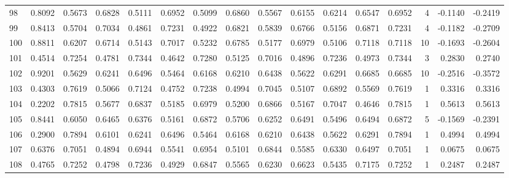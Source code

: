 \begin{tabular}{lrrrrrrrrrrrrrrr}
98  &      0.8092 &  0.5673 &  0.6828 &  0.5111 &  0.6952 &  0.5099 &  0.6860 &  0.5567 &  0.6155 &  0.6214 &   0.6547 &     0.6952 &      4 &                   -0.1140 &                    -0.2419 \\
99  &      0.8413 &  0.5704 &  0.7034 &  0.4861 &  0.7231 &  0.4922 &  0.6821 &  0.5839 &  0.6766 &  0.5156 &   0.6871 &     0.7231 &      4 &                   -0.1182 &                    -0.2709 \\
100 &      0.8811 &  0.6207 &  0.6714 &  0.5143 &  0.7017 &  0.5232 &  0.6785 &  0.5177 &  0.6979 &  0.5106 &   0.7118 &     0.7118 &     10 &                   -0.1693 &                    -0.2604 \\
101 &      0.4514 &  0.7254 &  0.4781 &  0.7344 &  0.4642 &  0.7280 &  0.5125 &  0.7016 &  0.4896 &  0.7236 &   0.4973 &     0.7344 &      3 &                    0.2830 &                     0.2740 \\
102 &      0.9201 &  0.5629 &  0.6241 &  0.6496 &  0.5464 &  0.6168 &  0.6210 &  0.6438 &  0.5622 &  0.6291 &   0.6685 &     0.6685 &     10 &                   -0.2516 &                    -0.3572 \\
103 &      0.4303 &  0.7619 &  0.5066 &  0.7124 &  0.4752 &  0.7238 &  0.4994 &  0.7045 &  0.5107 &  0.6892 &   0.5569 &     0.7619 &      1 &                    0.3316 &                     0.3316 \\
104 &      0.2202 &  0.7815 &  0.5677 &  0.6837 &  0.5185 &  0.6979 &  0.5200 &  0.6866 &  0.5167 &  0.7047 &   0.4646 &     0.7815 &      1 &                    0.5613 &                     0.5613 \\
105 &      0.8441 &  0.6050 &  0.6465 &  0.6376 &  0.5161 &  0.6872 &  0.5706 &  0.6252 &  0.6491 &  0.5496 &   0.6494 &     0.6872 &      5 &                   -0.1569 &                    -0.2391 \\
106 &      0.2900 &  0.7894 &  0.6101 &  0.6241 &  0.6496 &  0.5464 &  0.6168 &  0.6210 &  0.6438 &  0.5622 &   0.6291 &     0.7894 &      1 &                    0.4994 &                     0.4994 \\
107 &      0.6376 &  0.7051 &  0.4894 &  0.6944 &  0.5541 &  0.6954 &  0.5101 &  0.6844 &  0.5585 &  0.6330 &   0.6497 &     0.7051 &      1 &                    0.0675 &                     0.0675 \\
108 &      0.4765 &  0.7252 &  0.4798 &  0.7236 &  0.4929 &  0.6847 &  0.5565 &  0.6230 &  0.6623 &  0.5435 &   0.7175 &     0.7252 &      1 &                    0.2487 &                     0.2487 \\

\end{tabular}
